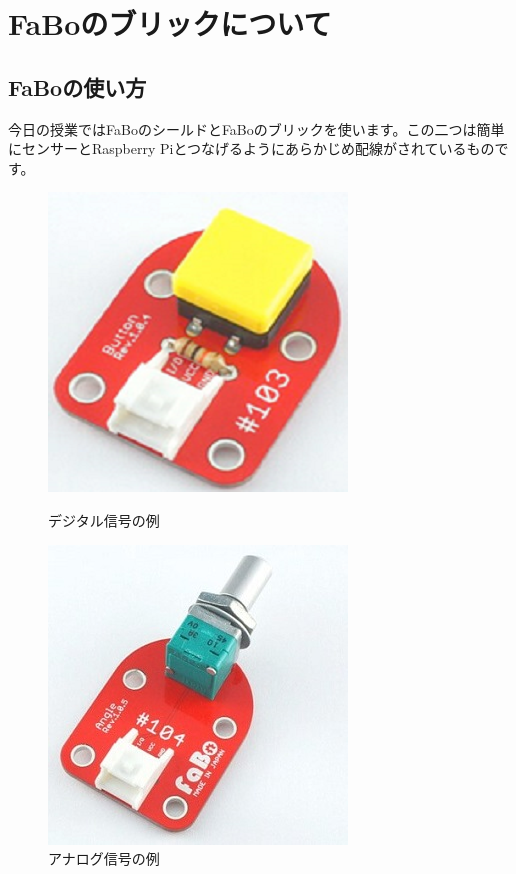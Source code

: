 \section{FaBoのブリックについて}
\subsection{FaBoの使い方}
今日の授業ではFaBoのシールドとFaBoのブリックを使います。この二つは簡単にセンサーとRaspberry Piとつなげるようにあらかじめ配線がされているものです。

\begin{figure}[htbp]
  \begin{minipage}[b]{0.45\linewidth}
    \centering
    \includegraphics[keepaspectratio, scale=0.6]{images/chap05/text05-img028.png}
    \caption{デジタル信号の例}
    \label{fig4}
  \end{minipage}
  \begin{minipage}[b]{0.45\linewidth}
    \centering
    \includegraphics[keepaspectratio, scale=0.6]{images/chap05/text05-img022.jpg}
    \caption{アナログ信号の例}
    \label{fig5}
  \end{minipage}
\end{figure}


